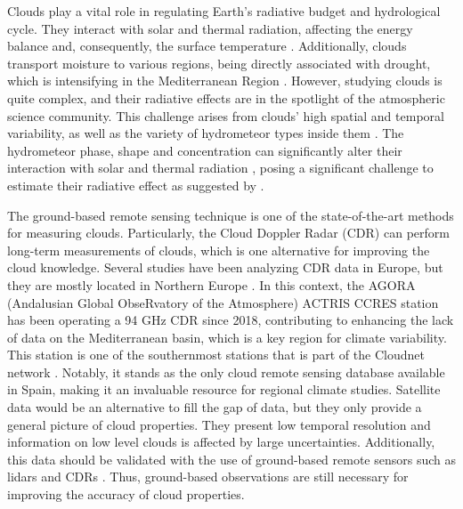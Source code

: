 Clouds play a vital role in regulating Earth's radiative budget and hydrological cycle. They interact with solar and thermal radiation, affecting the energy balance and, consequently, the surface temperature \citep{twomeyInfluencePollutionShortwave1977, brenguierCloudMicrophysicalRadiative2003, zengModelingRadiativeEffect2021}. Additionally, clouds transport moisture to various regions, being directly associated with drought, which is intensifying in the Mediterranean Region \citep{rios-entenzaMoistureRecyclingIberian2014, hoerlingIncreasedFrequencyMediterranean2012a}. However, studying clouds is quite complex, and their radiative effects are in the spotlight of the atmospheric science community. This challenge arises from clouds' high spatial and temporal variability, as well as the variety of hydrometeor types inside them \citep{intergovernmentalpanelonclimatechangeipccEarthEnergyBudget2023}. The hydrometeor phase, shape and concentration can significantly alter their interaction with solar and thermal radiation \citep{yoshidaEffectsVerticalProfiles2005}, posing a significant challenge to estimate their radiative effect as suggested by \cite{XXX}.


The ground-based remote sensing technique is one of the state-of-the-art methods for measuring clouds. Particularly, the Cloud Doppler Radar (CDR) can perform long-term measurements of clouds, which is one alternative for improving the cloud knowledge. Several studies have been analyzing CDR data in Europe, but they are mostly located in Northern Europe \citep{kneifelMultiyearCloudPrecipitation2022, nomokonovaStatisticsCloudsTheir2019, buhlMeasuringIceLiquidwater2016, achtertPropertiesArcticLiquid2020}. In this context, the AGORA (Andalusian Global ObseRvatory of the Atmosphere) ACTRIS CCRES station has been operating a 94 GHz CDR since 2018, contributing to enhancing the lack of data on the Mediterranean basin, which is a key region for climate variability. This station is one of the southernmost stations that is part of the Cloudnet network \citep{illingworthCloudnet2007}. Notably, it stands as the only cloud remote sensing database available in Spain, making it an invaluable resource for regional climate studies. 
Satellite data would be an alternative to fill the gap of data, but they only provide a general  picture of cloud properties. They present low temporal resolution and information on low level clouds is affected by large uncertainties. Additionally, this data should be validated with the use of ground-based remote sensors such as lidars and CDRs \citep{protatImpactConditionalSampling2006, protatEvaluationCloudSatCALIPSO2010}.
Thus, ground-based observations are still necessary for improving the accuracy of cloud properties.

